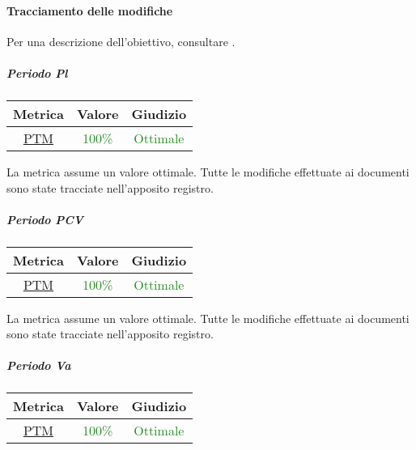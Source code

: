 				\newpage
				
			\paragraph{Tracciamento delle modifiche}
				Per una descrizione dell'obiettivo, consultare .
				\subparagraph{Periodo Pl} 
				\begin{table}[H]
					\centering
					\begin{tabular}{  c | c | c}
						\hline
						\textbf{Metrica} & \textbf{Valore} & \textbf{Giudizio} \\
						\hline
						\hyperref[MMC]{PTM}   & \textcolor{ForestGreen}{100\%}          & \textcolor{ForestGreen}{Ottimale} \\ \hline
					\end{tabular} 
				\end{table}
			
			La metrica assume un valore ottimale. Tutte le modifiche effettuate ai documenti sono state tracciate nell'apposito registro.
			
			\subparagraph{Periodo PCV} 
			\begin{table}[H]
				\centering
				\begin{tabular}{  c | c | c}
					\hline
					\textbf{Metrica} & \textbf{Valore} & \textbf{Giudizio} \\
					\hline
					\hyperref[MMC]{PTM}   & \textcolor{ForestGreen}{100\%}          & \textcolor{ForestGreen}{Ottimale} \\ \hline
				\end{tabular} 
			\end{table}
			
					La metrica assume un valore ottimale. Tutte le modifiche effettuate ai documenti sono state tracciate nell'apposito registro.
					
					\subparagraph{Periodo Va} 
					\begin{table}[H]
						\centering
						\begin{tabular}{  c | c | c}
							\hline
							\textbf{Metrica} & \textbf{Valore} & \textbf{Giudizio} \\
							\hline
							\hyperref[MMC]{PTM}   & \textcolor{ForestGreen}{100\%}          & \textcolor{ForestGreen}{Ottimale} \\ \hline
						\end{tabular} 
					\end{table}
					
